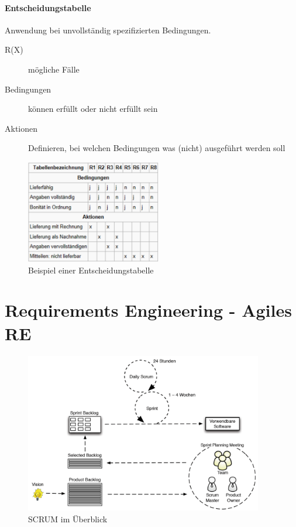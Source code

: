 \documentclass[a4paper]{article}
\begin{document}
					\paragraph{Entscheidungstabelle} 
					
					Anwendung bei unvollständig spezifizierten Bedingungen.
					
					\begin{description}
						\item[R(X)] mögliche Fälle
						\item[Bedingungen] können erfüllt oder nicht erfüllt sein
						\item[Aktionen] Definieren, bei welchen Bedingungen was (nicht) ausgeführt werden soll
					\end{description}
				
					\begin{figure}[!htb]
						\centering
						\includegraphics[height=4.5cm]{img/re/03/entscheidungstabelle.png}
						\caption{Beispiel einer Entscheidungstabelle}
						\label{fig:re_entscheidungstabelle}
					\end{figure}
	
\newpage

	\section{Requirements Engineering - Agiles RE}
	
	\begin{figure}[!htb]
		\centering
		\includegraphics[height=7cm]{img/re/05/scrum_overview.png}
		\caption{SCRUM im Überblick}
		\label{fig:re_scrum_overview}
	\end{figure}

	
	
	
	
	
	
\end{document}
